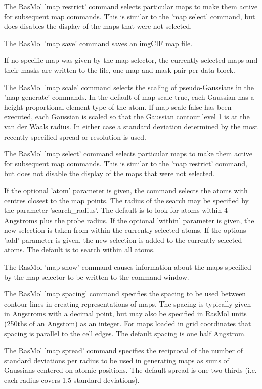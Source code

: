 The RasMol
'map restrict'
command selects particular maps to make them active for
subsequent map commands.  This is similar to the
'map select'
command, but does disables the display of the
maps that were not selected.

The RasMol
'map save'
command saves an imgCIF map file.

If no specific map was given by the map selector, the currently
selected maps and their masks are written to the file, one
map and mask pair per data block.

The RasMol
'map scale'
command selects the scaling of pseudo-Gaussians in the
'map generate'
commands.
In the default of map scale true, each Gaussian has a height proportional
element type of the atom.
If map scale false has been executed, each Gaussian is scaled so that
the Gaussian contour level 1 is at the van der Waals radius.
In either case a standard deviation determined by the
most recently specified spread or resolution is used.

The RasMol
'map select'
command selects particular maps to make them active for
subsequent map commands.  This is similar to the
'map restrict'
command, but does not disable the display of the
maps that were not selected.

If the optional
'atom'
parameter is given, the command selects the atoms with centres closest to the
map points.  The radius of the search may be specified by the parameter
'search_radius'.
The default is to look for atoms within 4 Angstroms plus the probe radius.
If the optional
'within'
parameter is given, the new selection is taken from within the currently
selected atoms.  If the options
'add'
parameter is given, the new selection is added to the currently selected atoms.
The default is to search within all atoms.

The RasMol
'map show'
command causes information about the maps specified by
the map selector to be written to the command window.

The RasMol
'map spacing'
command specifies the spacing to be used between contour lines
in creating representations of maps.  The spacing is typically
 given in Angstroms with a decimal point, but may also be
specified in RasMol units (250ths of an Angstom) as an
integer.  For maps loaded in grid coordinates that spacing
is parallel to the cell edges.  The default spacing is
one half Angstrom.

The RasMol
'map spread'
command specifies the reciprocal of the number of
standard deviations per radius to be used in
generating maps as sums of Gaussians centered
on atomic positions.  The default spread is one
two thirds (i.e. each radius covers 1.5 standard deviations).

